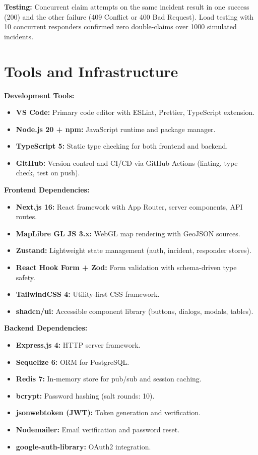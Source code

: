 \textbf{Testing:} Concurrent claim attempts on the same incident result in one success (200) and the other failure (409 Conflict or 400 Bad Request). Load testing with 10 concurrent responders confirmed zero double-claims over 1000 simulated incidents.

\section{Tools and Infrastructure}

\textbf{Development Tools:}
\begin{itemize}
  \item \textbf{VS Code:} Primary code editor with ESLint, Prettier, TypeScript extension.
  \item \textbf{Node.js 20 + npm:} JavaScript runtime and package manager.
  \item \textbf{TypeScript 5:} Static type checking for both frontend and backend.
  \item \textbf{GitHub:} Version control and CI/CD via GitHub Actions (linting, type check, test on push).
\end{itemize}

\textbf{Frontend Dependencies:}
\begin{itemize}
  \item \textbf{Next.js 16:} React framework with App Router, server components, API routes.
  \item \textbf{MapLibre GL JS 3.x:} WebGL map rendering with GeoJSON sources.
  \item \textbf{Zustand:} Lightweight state management (auth, incident, responder stores).
  \item \textbf{React Hook Form + Zod:} Form validation with schema-driven type safety.
  \item \textbf{TailwindCSS 4:} Utility-first CSS framework.
  \item \textbf{shadcn/ui:} Accessible component library (buttons, dialogs, modals, tables).
\end{itemize}

\textbf{Backend Dependencies:}
\begin{itemize}
  \item \textbf{Express.js 4:} HTTP server framework.
  \item \textbf{Sequelize 6:} ORM for PostgreSQL.
  \item \textbf{Redis 7:} In-memory store for pub/sub and session caching.
  \item \textbf{bcrypt:} Password hashing (salt rounds: 10).
  \item \textbf{jsonwebtoken (JWT):} Token generation and verification.
  \item \textbf{Nodemailer:} Email verification and password reset.
  \item \textbf{google-auth-library:} OAuth2 integration.
\end{itemize}

